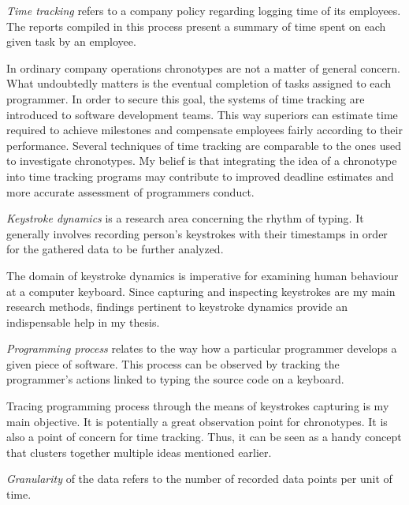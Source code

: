 \begin{definition}
\emph{Time tracking} refers to a company policy regarding logging time of its employees. The reports compiled in this process present a summary of time spent on each given task by an employee. \cite{Fed21TimeTracking}
\end{definition}

In ordinary company operations chronotypes are not a matter of general concern. What undoubtedly matters is the eventual completion of tasks assigned to each programmer. In order to secure this goal, the systems of time tracking are introduced to software development teams. This way superiors can estimate time required to achieve milestones and compensate employees fairly according to their performance. Several techniques of time tracking are comparable to the ones used to investigate chronotypes. My belief is that integrating the idea of a chronotype into time tracking programs may contribute to improved deadline estimates and more accurate assessment of programmers conduct.

\begin{definition}
\emph{Keystroke dynamics} is a research area concerning the rhythm of typing. It generally involves recording person's keystrokes with their timestamps in order for the gathered data to be further analyzed. \cite{Lei19Dissertation}
\end{definition}

The domain of keystroke dynamics is imperative for examining human behaviour at a computer keyboard. Since capturing and inspecting keystrokes are my main research methods, findings pertinent to keystroke dynamics provide an indispensable help in my thesis.

\begin{definition}\label{def:programming_process}
\emph{Programming process} relates to the way how a particular programmer develops a given piece of software. This process can be observed by tracking the programmer's actions linked to typing the source code on a keyboard. \cite{Mat13PPV}
\end{definition}

Tracing programming process through the means of keystrokes capturing is my main objective. It is potentially a great observation point for chronotypes. It is also a point of concern for time tracking. Thus, it can be seen as a handy concept that clusters together multiple ideas mentioned earlier.

\begin{definition}
\emph{Granularity} of the data refers to the number of recorded data points per unit of time.
\end{definition}

